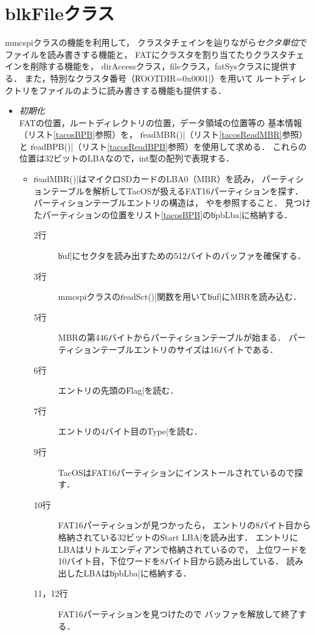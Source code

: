 \section{blkFileクラス}
mmcspiクラスの機能を利用して，
クラスタチェインを辿りながら\emph{セクタ単位}でファイルを読み書きする機能と，
FATにクラスタを割り当てたりクラスタチェインを削除する機能を，
dirAccessクラス，fileクラス，fatSysクラスに提供する．
また，特別なクラスタ番号（\|ROOTDIR=0x0001|）を用いて
ルートディレクトリをファイルのように読み書きする機能も提供する．

\begin{itemize}
\item \emph{初期化}\\
  FATの位置，ルートディレクトリの位置，データ領域の位置等の
  基本情報（リスト\ref{tacosBPB}参照）を，
  \|readMBR()|（リスト\ref{tacosReadMBR}参照）と
  \|readBPB()|（リスト\ref{tacosReadBPB}参照）を使用して求める．
  これらの位置は32ビットのLBAなので，int型の配列で表現する．

  

  \begin{itemize}
  \item \|readMBR()|はマイクロSDカードのLBA0（MBR）を読み，
    パーティションテーブルを解析してTacOSが扱えるFAT16パーティションを探す．
    パーティションテーブルエントリの構造は，
    やを参照すること．
    見つけたパーティションの位置をリスト\ref{tacosBPB}の\|bpbLba|に格納する．
  
    

    \begin{description}
    \item[2行] \|buf|にセクタを読み出すための512バイトのバッファを確保する．
    \item[3行] mmcspiクラスの\|readSct()|関数を用いて\|buf|にMBRを読み込む．
    \item[5行] MBRの第446バイトからパーティションテーブルが始まる．
      パーティションテーブルエントリのサイズは16バイトである．
    \item[6行] エントリの先頭の\|Flag|を読む．
    \item[7行] エントリの4バイト目の\|Type|を読む．
    \item[9行] TacOSはFAT16パーティションにインストールされているので探す．
    \item[10行] FAT16パーティションが見つかったら，
      エントリの8バイト目から格納されている32ビットの\|Start LBA|を読み出す．
      エントリにLBAはリトルエンディアンで格納されているので，
      上位ワードを10バイト目，下位ワードを8バイト目から読み出している．
      読み出したLBAは\|bpbLba|に格納する．
    \item[11，12行] FAT16パーティションを見つけたので
      バッファを解放して終了する．
    \end{description}


\end{itemize}
\end{itemize}
